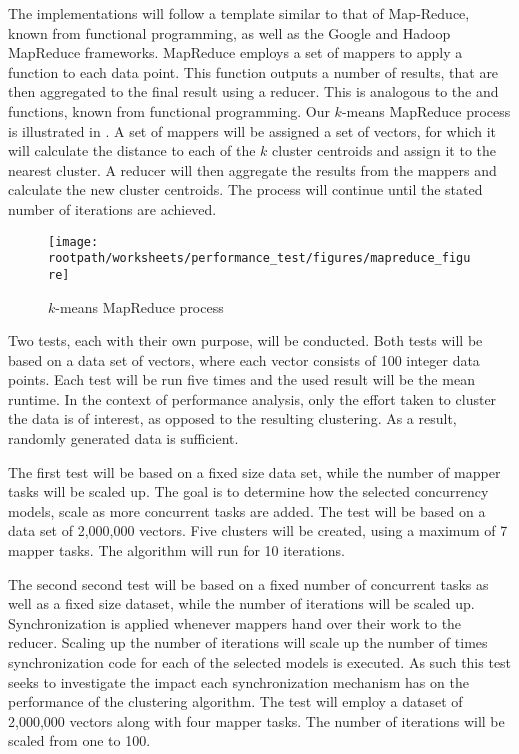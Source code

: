 The implementations will follow a template similar to that of Map-Reduce\cite{dean2008mapreduce}, known from functional programming, as well as the Google and Hadoop MapReduce frameworks. MapReduce employs a set of mappers to apply a function to each data point. This function outputs a number of results, that are then aggregated to the final result using a reducer. This is analogous to the  and  functions, known from functional programming. Our $k$-means MapReduce process is illustrated in . A set of mappers will be assigned a set of vectors, for which it will calculate the distance to each of the $k$ cluster centroids and assign it to the nearest cluster. A reducer will then aggregate the results from the mappers and calculate the new cluster centroids. The process will continue until the stated number of iterations are achieved.

\begin{figure}[ht!]
\centering
\texttt{[image: \\rootpath/worksheets/performance\_test/figures/mapreduce\_figure]}
\caption{$k$-means MapReduce process}\label{fig:kmeans_mapreduce}
\end{figure}

Two tests, each with their own purpose, will be conducted. Both tests will be based on a data set of vectors, where each vector consists of 100 integer data points. Each test will be run five times and the used result will be the mean runtime. In the context of performance analysis, only the effort taken to cluster the data is of interest, as opposed to the resulting clustering. As a result, randomly generated data is sufficient.

The first test will be based on a fixed size data set, while the number of mapper tasks will be scaled up. The goal is to determine how the selected concurrency models, scale as more concurrent tasks are added. The test will be based on a data set of 2,000,000 vectors. Five clusters will be created, using a maximum of 7 mapper tasks. The algorithm will run for 10 iterations.

The second second test will be based on a fixed number of concurrent tasks as well as a fixed size dataset, while the number of iterations will be scaled up.  Synchronization is applied whenever mappers hand over their work to the reducer. Scaling up the number of iterations will scale up the number of times synchronization code for each of the selected models is executed. As such this test seeks to investigate the impact each synchronization mechanism has on the performance of the clustering algorithm. The test will employ a dataset of 2,000,000 vectors along with four mapper tasks. The number of iterations will be scaled from one to 100.

